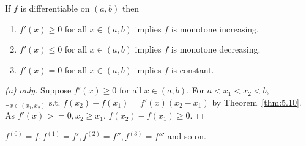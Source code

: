 \begin{thm}[11]
	If $f$ is differentiable on $(a,b)$ then
	\begin{enumerate}
		\item  $f'(x)\ge 0$ for all $x \in (a,b)$ implies $f$ is monotone increasing.
		\item  $f'(x)\le 0$ for all $x \in (a,b)$ implies $f$ is monotone decreasing.
		\item  $f'(x)= 0$ for all $x \in (a,b)$ implies $f$ is constant.
	\end{enumerate}
	\begin{proof}[(a) only]
		Suppose $f'(x)\ge 0$ for all $x \in (a,b)$.
		For $a<x_1<x_2<b$, $\exists_{x \in (x_1,x_2)} \text{ s.t. } f(x_2)-f(x_1)=f'(x)(x_2-x_1)$ by Theorem~\ref{thm:5.10}.
		As $f'(x)>=0, x_2\ge x_1$, $f(x_2)-f(x_1)\ge 0$.
	\end{proof}
\end{thm}

\begin{definition}
	$f^{(0)}=f, f^{(1)}=f', f^{(2)}=f'', f^{(3)}=f'''$ and so on.
\end{definition}

